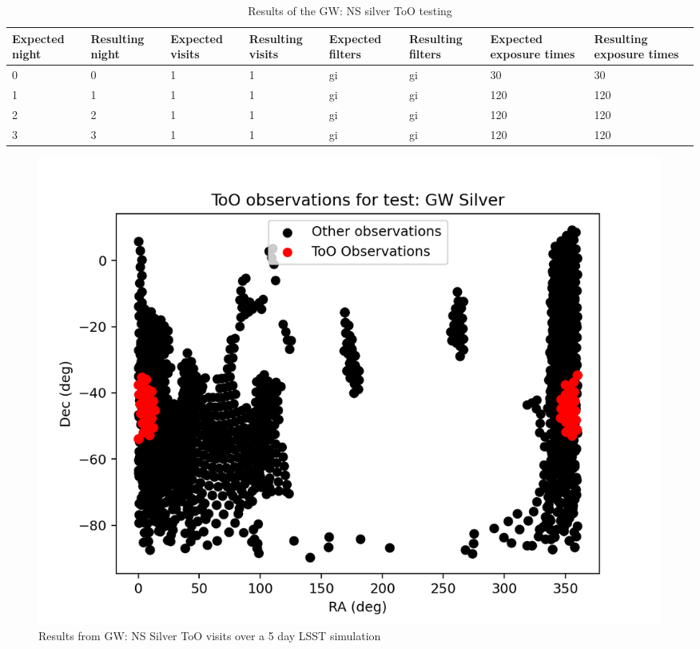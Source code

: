 \begin{table}[h]
\centering
\begin{adjustbox}{max width=\textwidth}
\begin{tabular}{|l|l|l|l|l|l|l|l|}
\hline
Expected night & Resulting night & Expected visits & Resulting visits & Expected filters & Resulting filters & Expected exposure times & Resulting exposure times \\ \hline
0              & 0               & 1               & 1                & gi               & gi                & 30                      & 30                       \\ \hline
1              & 1               & 1               & 1                & gi               & gi                & 120                     & 120                      \\ \hline
2              & 2               & 1               & 1                & gi               & gi                & 120                     & 120                      \\ \hline
3              & 3               & 1               & 1                & gi               & gi                & 120                     & 120                      \\ \hline
\end{tabular}
\end{adjustbox}
\caption{Results of the GW: NS silver ToO testing}
\label{tab:GWSilverResults}
\end{table}

\begin{figure}
    \centering
    \includegraphics[width=\linewidth]{figures/validationTests/SVRequired/GWSilverPosition.png}
    \caption{Results from GW: NS Silver ToO visits over a 5 day LSST simulation}
    \label{fig:GWSilverPositionResult}
\end{figure}

